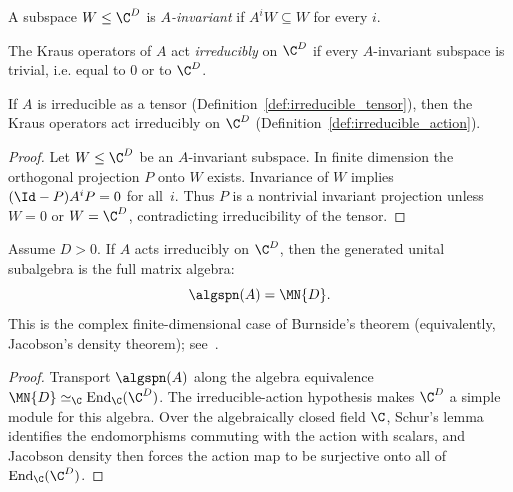 \begin{definition}\label{def:invariant_submodule}
    \leanok
    A subspace $W \le \C^D$ is \emph{$A$-invariant} if
    $A^i W \subseteq W$ for every $i$.
\end{definition}

\begin{definition}\label{def:irreducible_action}
    \leanok
    The Kraus operators of $A$ act \emph{irreducibly} on $\C^D$ if every
    $A$-invariant subspace is trivial, i.e. equal to $0$ or to $\C^D$.
\end{definition}

\begin{theorem}\label{thm:irreducible_tensor_to_action}
    \leanok
    If $A$ is irreducible as a tensor (Definition~\ref{def:irreducible_tensor}),
    then the Kraus operators act irreducibly on $\C^D$
    (Definition~\ref{def:irreducible_action}).
\end{theorem}

\begin{proof}\leanok
    Let $W \le \C^D$ be an $A$-invariant subspace.
    In finite dimension the orthogonal projection $P$ onto $W$ exists.
    Invariance of $W$ implies $(\Id - P) A^i P = 0$ for all~$i$.
    Thus $P$ is a nontrivial invariant projection unless $W = 0$ or $W = \C^D$,
    contradicting irreducibility of the tensor.
\end{proof}

\begin{theorem}\label{thm:burnside_matrix}
    \leanok
    Assume $D > 0$.
    If $A$ acts irreducibly on $\C^D$, then the generated unital subalgebra is the
    full matrix algebra:
    \[
        \algspn(A) = \MN{D}.
    \]
    This is the complex finite-dimensional case of Burnside's theorem
    (equivalently, Jacobson's density theorem); see~\cite{Jacobson2009BasicAlgebraII}.
\end{theorem}

\begin{proof}\leanok
    Transport $\algspn(A)$ along the algebra equivalence
    $\MN{D} \simeq_{\C} \operatorname{End}_{\C}(\C^D)$.
    The irreducible-action hypothesis makes $\C^D$ a simple module for this
    algebra.
    Over the algebraically closed field $\C$, Schur's lemma identifies the
    endomorphisms commuting with the action with scalars, and Jacobson density
    then forces the action map to be surjective onto all of
    $\operatorname{End}_{\C}(\C^D)$.
\end{proof}

